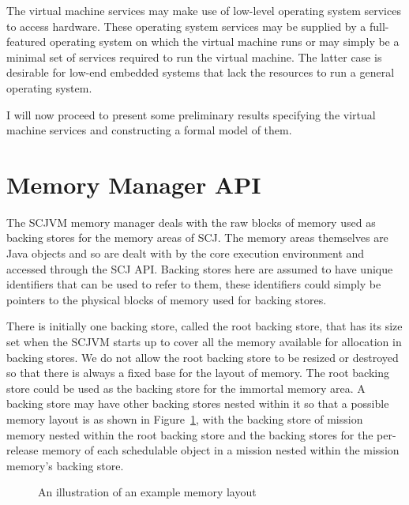 \documentclass[a4paper,10pt]{report}
\begin{document}
The virtual machine services may make use of low-level operating system
services to access hardware.  These operating system services may be supplied by
a full-featured operating system on which the virtual machine runs or may simply
be a minimal set of services required to run the virtual machine.  The latter
case is desirable for low-end embedded systems that lack the resources to
run a general operating system.

I will now proceed to present some preliminary results specifying the virtual
machine services and constructing a formal model of them.

\section{Memory Manager API}
\label{memory-manager-sec}

The SCJVM memory manager deals with the raw blocks of memory used as backing
stores for the memory areas of SCJ. The memory areas themselves are Java objects
and so are dealt with by the core execution environment and accessed through the
SCJ API. Backing stores here are assumed to have unique identifiers that can be
used to refer to them, these identifiers could simply be pointers to the
physical blocks of memory used for backing stores.

There is initially one backing store, called the root backing store, that has
its size set when the SCJVM starts up to cover all the memory available for
allocation in backing stores. We do not allow the root backing store to be
resized or destroyed so that there is always a fixed base for the layout of 
memory. The root backing store could be used as the backing store for the
immortal memory area. A backing store may have other backing stores nested
within it so that a possible memory layout is as shown in 
Figure~\ref{memory-fig}, with the backing store of mission memory nested within
the root backing store and the backing stores for the per-release memory of each
schedulable object in a mission nested within the mission memory's backing
store.

\begin{figure}[ht]
  \centering
  \caption{An illustration of an example memory layout}
  \label{memory-fig}
\end{figure}
\end{document}
